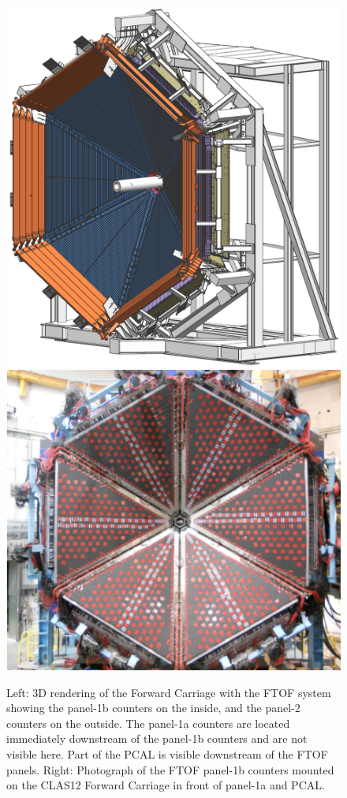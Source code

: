 \documentclass[final,3p,twocolumn]{elsarticle}
\begin{document}
\begin{figure}[htbp!]
\hspace{0.3cm}\includegraphics[width=0.95\columnwidth]{fwd_carriage-1.png}
\hspace{0.3cm}\includegraphics[width=1.0\columnwidth]{FTOF-1b.png}
\caption{Left: 3D rendering of the Forward Carriage with the FTOF system showing the panel-1b counters on the
inside, and the panel-2 counters on the outside. The panel-1a counters are located immediately downstream of the
panel-1b counters and are not visible here. Part of the PCAL is visible downstream of the FTOF panels. Right:
Photograph of the FTOF panel-1b counters mounted on the CLAS12 Forward Carriage in front of panel-1a and PCAL.} 
\label{ftof-1b}
\end{figure}
\end{document}
